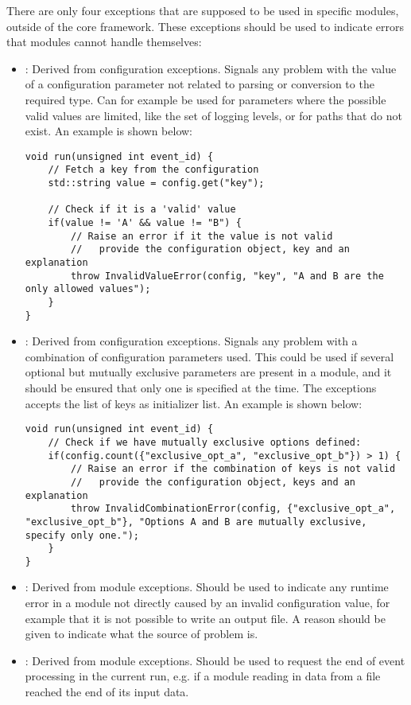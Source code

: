 There are only four exceptions that are supposed to be used in specific modules, outside of the core framework.
These exceptions should be used to indicate errors that modules cannot handle themselves:
\begin{itemize}
\item {}: Derived from configuration exceptions.
Signals any problem with the value of a configuration parameter not related to parsing or conversion to the required type.
Can for example be used for parameters where the possible valid values are limited, like the set of logging levels, or for paths that do not exist.
An example is shown below:
\begin{verbatim}
void run(unsigned int event_id) {
    // Fetch a key from the configuration
    std::string value = config.get("key");

    // Check if it is a 'valid' value
    if(value != 'A' && value != "B") {
        // Raise an error if it the value is not valid
        //   provide the configuration object, key and an explanation
        throw InvalidValueError(config, "key", "A and B are the only allowed values");
    }
}
\end{verbatim}
\item {}: Derived from configuration exceptions.
Signals any problem with a combination of configuration parameters used.
This could be used if several optional but mutually exclusive parameters are present in a module, and it should be ensured that only one is specified at the time.
The exceptions accepts the list of keys as initializer list.
An example is shown below:
\begin{verbatim}
void run(unsigned int event_id) {
    // Check if we have mutually exclusive options defined:
    if(config.count({"exclusive_opt_a", "exclusive_opt_b"}) > 1) {
        // Raise an error if the combination of keys is not valid
        //   provide the configuration object, keys and an explanation
        throw InvalidCombinationError(config, {"exclusive_opt_a", "exclusive_opt_b"}, "Options A and B are mutually exclusive, specify only one.");
    }
}
\end{verbatim}

\item {}: Derived from module exceptions.
Should be used to indicate any runtime error in a module not directly caused by an invalid configuration value, for example that it is not possible to write an output file.
A reason should be given to indicate what the source of problem is.
\item {}: Derived from module exceptions.
Should be used to request the end of event processing in the current run, e.g. if a module reading in data from a file reached the end of its input data.
\end{itemize}

